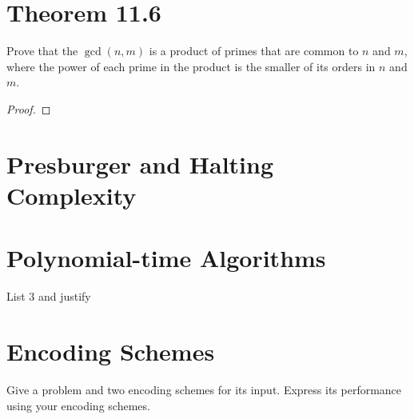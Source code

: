 \documentclass{article}
\renewcommand{\_}{\ifincsname_\else\legacyunderscore\fi}
\begin{document}
\section*{Theorem 11.6}

    Prove that the $\gcd(n, m)$ is a product of primes that are common to $n$ and $m$, where the power of each prime in the product is the smaller of its orders in $n$ and $m$.

    \begin{proof}
        
    \end{proof}

\section*{Presburger and Halting Complexity}

\section*{Polynomial-time Algorithms}

    List 3 and justify

\section*{Encoding Schemes}

    Give a problem and two encoding schemes for its input.  Express its performance using your encoding schemes.
\end{document}
